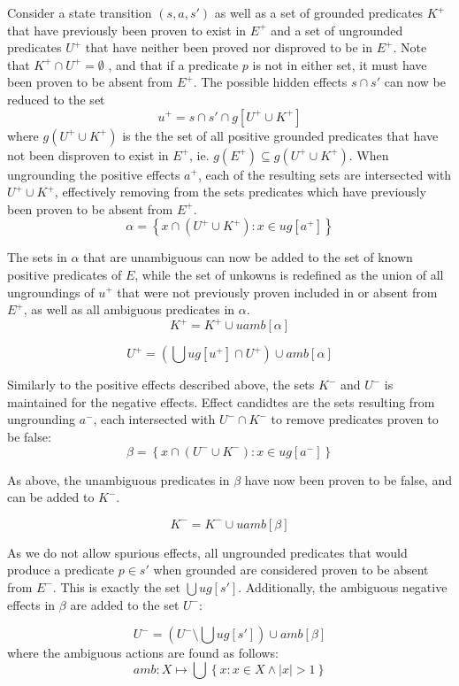 \documentclass[../Master.tex]{subfiles}
\begin{document}
Consider a state transition $\left(s,a,s'\right)$ as well as a set
of grounded predicates $K^{+}$ that have previously been proven to
exist in $E^{+}$ and a set of ungrounded predicates $U^{+}$ that
have neither been proved nor disproved to be in $E^{+}$. Note that
$K^{+}\cap U^{+}=\emptyset$ , and that if a predicate $p$ is not
in either set, it must have been proven to be absent from $E^{+}$.
The possible hidden effects $s\cap s'$ can now be reduced to the
set
\[
u^{+}=s\cap s'\cap g\left[U^{+}\cup K^{+}\right]
\]
where $g\left(U^{+}\cup K^{+}\right)$ is the the set of all positive
grounded predicates that have not been disproven to exist in $E^{+}$,
ie. $g\left(E^{+}\right)\subseteq g\left(U^{+}\cup K^{+}\right)$.
When ungrounding the positive effects $a^{+}$, each of the resulting
sets are intersected with $U^{+}\cup K^{+}$, effectively removing
from the sets predicates which have previously been proven to be absent
from $E^{+}$.
\[
\alpha=\left\{ x\cap\left(U^{+}\cup K^{+}\right):x\in ug\left[a^{+}\right]\right\}
\]


The sets in $\alpha$ that are unambiguous can now be added to the
set of known positive predicates of $E$, while the set of unkowns
is redefined as the union of all ungroundings of $u^{+}$ that were
not previously proven included in or absent from $E^{+}$, as well
as all ambiguous predicates in $\alpha$.
\[
K^{+}=K^{+}\cup uamb\left[\alpha\right]
\]


\[
U^{+}=\left(\bigcup ug\left[u^{+}\right]\cap U^{+}\right)\cup amb\left[\alpha\right]
\]


Similarly to the positive effects described above, the sets $K^{-}$
and $U^{-}$ is maintained for the negative effects. Effect candidtes
are the sets resulting from ungrounding $a^{-}$, each intersected
with $U^{-}\cap K^{-}$ to remove predicates proven to be false:
\[
\beta=\left\{ x\cap\left(U^{-}\cup K^{-}\right):x\in ug\left[a^{-}\right]\right\}
\]


As above, the unambiguous predicates in $\beta$ have now been proven
to be false, and can be added to $K^{-}$.

\[
K^{-}=K^{-}\cup uamb\left[\beta\right]
\]


As we do not allow spurious effects, all ungrounded predicates that
would produce a predicate $p\in s'$ when grounded are considered
proven to be absent from $E^{-}$. This is exactly the set $\bigcup ug\left[s'\right]$.
Additionally, the ambiguous negative effects in $\beta$ are added
to the set $U^{-}$:

\[
U^{-}=\left(U^{-}\setminus\bigcup ug\left[s'\right]\right)\cup amb\left[\beta\right]
\]
where the ambiguous actions are found as follows:
\[
amb:X\mapsto\bigcup\left\{ x:x\in X\land|x|>1\right\}
\]
\end{document}
